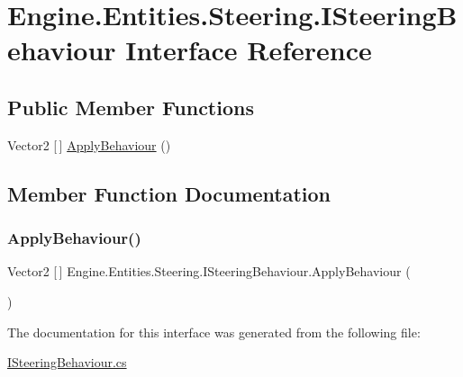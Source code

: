 \hypertarget{a00338}{}\section{Engine.\+Entities.\+Steering.\+I\+Steering\+Behaviour Interface Reference}
\label{a00338}
\subsection*{Public Member Functions}
\begin{DoxyCompactItemize}
\item 
Vector2 \mbox{[}$\,$\mbox{]} \hyperlink{a00338_adef1f686b189cf585e7549595d44a2e3}{Apply\+Behaviour} ()
\end{DoxyCompactItemize}


\subsection{Member Function Documentation}
\mbox{\label{a00338_adef1f686b189cf585e7549595d44a2e3}} 
\subsubsection{\texorpdfstring{Apply\+Behaviour()}{ApplyBehaviour()}}
{\footnotesize\ttfamily Vector2 \mbox{[}$\,$\mbox{]} Engine.\+Entities.\+Steering.\+I\+Steering\+Behaviour.\+Apply\+Behaviour (\begin{DoxyParamCaption}{ }\end{DoxyParamCaption})}



The documentation for this interface was generated from the following file\+:\begin{DoxyCompactItemize}
\item 
\hyperlink{a00035}{I\+Steering\+Behaviour.\+cs}\end{DoxyCompactItemize}
